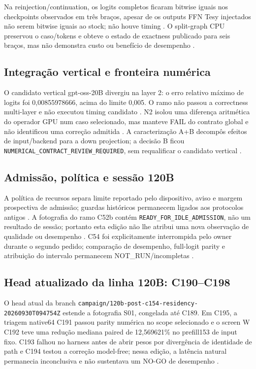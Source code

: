 Na reinjection/continuation, os logits completos ficaram bitwise iguais nos checkpoints observados em três braços, apesar de os outputs FFN Tesy injectados não serem bitwise iguais ao stock; não houve timing . O split-graph CPU preservou o caso/tokens e obteve o estado de exactness publicado para seis braços, mas não demonstra custo ou benefício de desempenho .

\subsection{Integração vertical e fronteira numérica}
O candidato vertical gpt-oss-20B divergiu na layer 2: o erro relativo máximo de logits foi 0,00855978666, acima do limite 0,005. O ramo não passou a correctness multi-layer e não executou timing candidato . N2 isolou uma diferença aritmética do operador GPU num caso selecionado, mas manteve FAIL do contrato global e não identificou uma correção admitida . A caracterização A+B decompôs efeitos de input/backend para a down projection; a decisão B ficou \texttt{NUMERICAL\_CONTRACT\_REVIEW\_REQUIRED}, sem requalificar o candidato vertical .

\subsection{Admissão, política e sessão 120B}
A política de recursos separa limite reportado pelo dispositivo, aviso e margem prospectiva de admissão; guardas históricos permanecem ligados aos protocolos antigos . A fotografia do ramo C52b contém \texttt{READY\_FOR\_IDLE\_ADMISSION}, não um resultado de sessão; portanto esta edição não lhe atribui uma nova observação de qualidade ou desempenho . C54 foi explicitamente interrompida pelo owner durante o segundo pedido; comparação de desempenho, full-logit parity e atribuição do intervalo permanecem NOT\_RUN/incompletas .

\subsection{Head atualizado da linha 120B: C190--C198}
O head atual da branch \texttt{campaign/120b-post-c154-residency-20260930T094754Z} estende a fotografia S01, congelada até C189. Em C195, a triagem native64 C191 passou parity numérica no scope selecionado e o screen W C192 teve uma redução mediana paired de 12,569621\% no prefill153 de input fixo. C193 falhou no harness antes de abrir pesos por divergência de identidade de path e C194 testou a correção model-free; nessa edição, a latência natural permanecia inconclusiva e não sustentava um NO-GO de desempenho .

